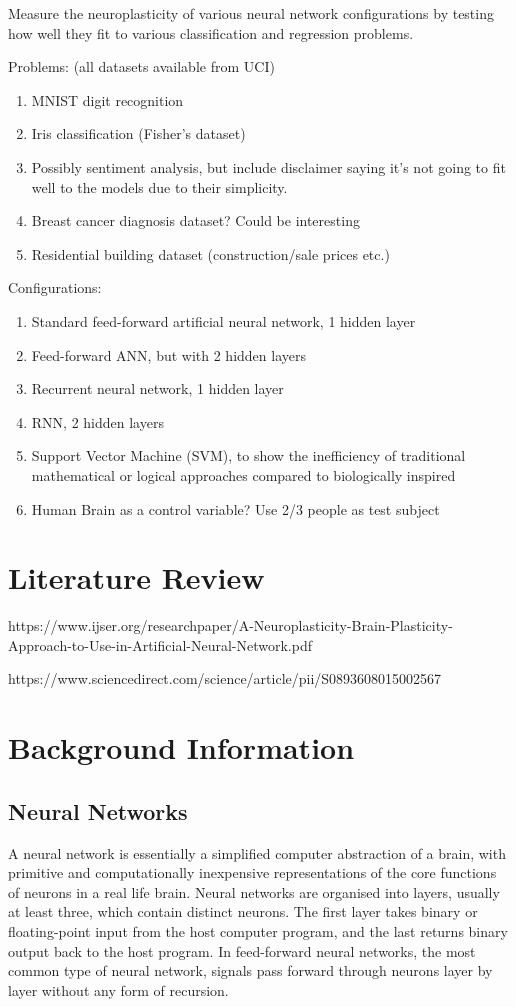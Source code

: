 \documentclass[]{report}
\begin{document}
Measure the neuroplasticity of various neural network configurations by testing how well they fit to various classification and regression problems.

Problems: (all datasets available from UCI)
\begin{enumerate}
	\item MNIST digit recognition
	\item Iris classification (Fisher's dataset)
	\item Possibly sentiment analysis, but include disclaimer saying it's not going to fit well to the models due to their simplicity.
	\item Breast cancer diagnosis dataset? Could be interesting
	\item Residential building dataset (construction/sale prices etc.)
\end{enumerate}

Configurations:
\begin{enumerate}
	\item Standard feed-forward artificial neural network, 1 hidden layer
	\item Feed-forward ANN, but with 2 hidden layers
	\item Recurrent neural network, 1 hidden layer
	\item RNN, 2 hidden layers
	\item Support Vector Machine (SVM), to show the inefficiency of traditional mathematical or logical approaches compared to biologically inspired
	\item Human Brain as a control variable? Use 2/3 people as test subject
\end{enumerate}

\section{Literature Review}

https://www.ijser.org/researchpaper/A-Neuroplasticity-Brain-Plasticity-Approach-to-Use-in-Artificial-Neural-Network.pdf

https://www.sciencedirect.com/science/article/pii/S0893608015002567


\section{Background Information}

\subsection{Neural Networks}
A neural network is essentially a simplified computer abstraction of a brain, with primitive and computationally inexpensive representations of the core functions of neurons in a real life brain. Neural networks are organised into layers, usually at least three, which contain distinct neurons. The first layer takes binary or floating-point input from the host computer program, and the last returns binary output back to the host program. In feed-forward neural networks, the most common type of neural network, signals pass forward through neurons layer by layer without any form of recursion.
\end{document}
